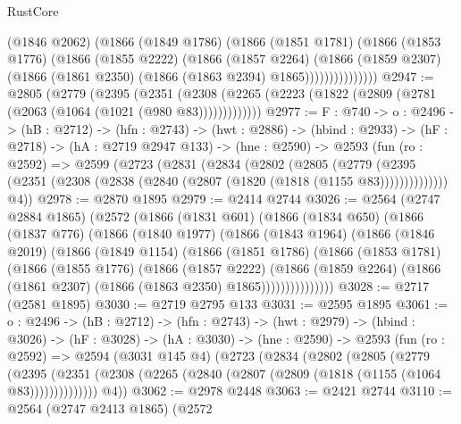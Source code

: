 \begin{lexlean}{RustCore}
\begin{coremodule}
                  (@1846 @2062)
                  (@1866
                    (@1849 @1786)
                    (@1866
                      (@1851 @1781)
                      (@1866
                        (@1853 @1776)
                        (@1866
                          (@1855 @2222)
                          (@1866
                            (@1857 @2264)
                            (@1866
                              (@1859 @2307)
                              (@1866 (@1861 @2350) (@1866 (@1863 @2394) @1865)))))))))))))))
@2947 := @2805
    (@2779
      (@2395
        (@2351 (@2308 (@2265 (@2223 (@1822 (@2809 (@2781 (@2063 (@1064 (@1021 (@980 @83)))))))))))))
@2977 := {F : @740} ->
  {o : @2496} ->
  (hB : @2712) ->
  (hfn : @2743) ->
  (hwt : @2886) ->
  (hbind : @2933) ->
  (hF : @2718) ->
  (hA : @2719 @2947 @133) ->
  (hne : @2590) ->
  @2593
    (fun (ro : @2592) =>
    @2599
      (@2723
        (@2831
          (@2834
            (@2802
              (@2805
                (@2779
                  (@2395 (@2351 (@2308 (@2838 (@2840 (@2807 (@1820 (@1818 (@1155 @83))))))))))))))
        @4))
@2978 := @2870 @1895
@2979 := @2414 @2744
@3026 := @2564
    (@2747 @2884 @1865)
    (@2572
      (@1866
        (@1831 @601)
        (@1866
          (@1834 @650)
          (@1866
            (@1837 @776)
            (@1866
              (@1840 @1977)
              (@1866
                (@1843 @1964)
                (@1866
                  (@1846 @2019)
                  (@1866
                    (@1849 @1154)
                    (@1866
                      (@1851 @1786)
                      (@1866
                        (@1853 @1781)
                        (@1866
                          (@1855 @1776)
                          (@1866
                            (@1857 @2222)
                            (@1866
                              (@1859 @2264)
                              (@1866 (@1861 @2307) (@1866 (@1863 @2350) @1865)))))))))))))))
@3028 := @2717 (@2581 @1895)
@3030 := @2719 @2795 @133
@3031 := @2595 @1895
@3061 := {o : @2496} ->
  (hB : @2712) ->
  (hfn : @2743) ->
  (hwt : @2979) ->
  (hbind : @3026) ->
  (hF : @3028) ->
  (hA : @3030) ->
  (hne : @2590) ->
  @2593
    (fun (ro : @2592) =>
    @2594
      (@3031 @145 @4)
      (@2723
        (@2834
          (@2802
            (@2805
              (@2779
                (@2395
                  (@2351 (@2308 (@2265 (@2840 (@2807 (@2809 (@1818 (@1155 (@1064 @83))))))))))))))
        @4))
@3062 := @2978 @2448
@3063 := @2421 @2744
@3110 := @2564
    (@2747 @2413 @1865)
    (@2572

\end{coremodule}
\end{lexlean}
